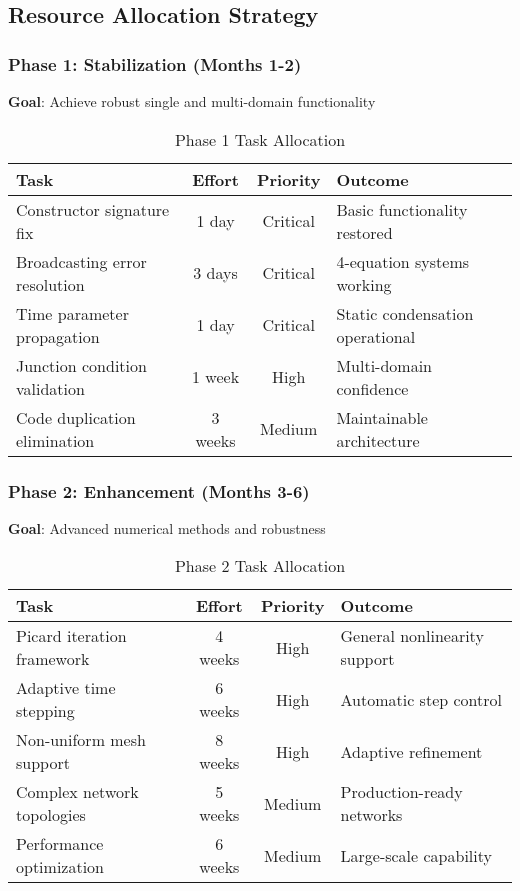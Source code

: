 \subsection{Resource Allocation Strategy}

\subsubsection{Phase 1: Stabilization (Months 1-2)}
\textbf{Goal}: Achieve robust single and multi-domain functionality

\begin{table}[h]
\centering
\begin{tabular}{|l|c|c|l|}
\hline
\textbf{Task} & \textbf{Effort} & \textbf{Priority} & \textbf{Outcome} \\
\hline
Constructor signature fix & 1 day & Critical & Basic functionality restored \\
Broadcasting error resolution & 3 days & Critical & 4-equation systems working \\
Time parameter propagation & 1 day & Critical & Static condensation operational \\
Junction condition validation & 1 week & High & Multi-domain confidence \\
Code duplication elimination & 3 weeks & Medium & Maintainable architecture \\
\hline
\end{tabular}
\caption{Phase 1 Task Allocation}
\end{table}

\subsubsection{Phase 2: Enhancement (Months 3-6)}
\textbf{Goal}: Advanced numerical methods and robustness

\begin{table}[h]
\centering
\begin{tabular}{|l|c|c|l|}
\hline
\textbf{Task} & \textbf{Effort} & \textbf{Priority} & \textbf{Outcome} \\
\hline
Picard iteration framework & 4 weeks & High & General nonlinearity support \\
Adaptive time stepping & 6 weeks & High & Automatic step control \\
Non-uniform mesh support & 8 weeks & High & Adaptive refinement \\
Complex network topologies & 5 weeks & Medium & Production-ready networks \\
Performance optimization & 6 weeks & Medium & Large-scale capability \\
\hline
\end{tabular}
\caption{Phase 2 Task Allocation}
\end{table}

